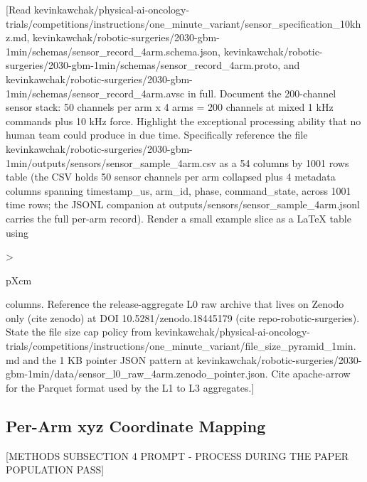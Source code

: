 [Read
kevinkawchak/physical-ai-oncology-trials/competitions/instructions/one_minute_variant/sensor_specification_10khz.md,
kevinkawchak/robotic-surgeries/2030-gbm-1min/schemas/sensor_record_4arm.schema.json,
kevinkawchak/robotic-surgeries/2030-gbm-1min/schemas/sensor_record_4arm.proto,
and
kevinkawchak/robotic-surgeries/2030-gbm-1min/schemas/sensor_record_4arm.avsc
in full. Document the 200-channel sensor stack: 50 channels per arm
x 4 arms = 200 channels at mixed 1 kHz commands plus 10 kHz force.
Highlight the exceptional processing ability that no human team
could produce in due time. Specifically reference the file
kevinkawchak/robotic-surgeries/2030-gbm-1min/outputs/sensors/sensor_sample_4arm.csv
as a 54 columns by 1001 rows table (the CSV holds 50 sensor channels
per arm collapsed plus 4 metadata columns spanning timestamp_us,
arm_id, phase, command_state, across 1001 time rows; the JSONL
companion at outputs/sensors/sensor_sample_4arm.jsonl carries the
full per-arm record). Render a small example slice as a LaTeX table
using {>{\raggedright\arraybackslash}p{Xcm}} columns. Reference the
release-aggregate L0 raw archive that lives on Zenodo only (cite
zenodo) at DOI 10.5281/zenodo.18445179 (cite repo-robotic-surgeries).
State the file size cap policy from
kevinkawchak/physical-ai-oncology-trials/competitions/instructions/one_minute_variant/file_size_pyramid_1min.md
and the 1 KB pointer JSON pattern at
kevinkawchak/robotic-surgeries/2030-gbm-1min/data/sensor_l0_raw_4arm.zenodo_pointer.json.
Cite apache-arrow for the Parquet format used by the L1 to L3
aggregates.]

\subsection{Per-Arm xyz Coordinate Mapping}
\label{sec:methods-xyz}

[METHODS SUBSECTION 4 PROMPT - PROCESS DURING THE PAPER POPULATION PASS]

